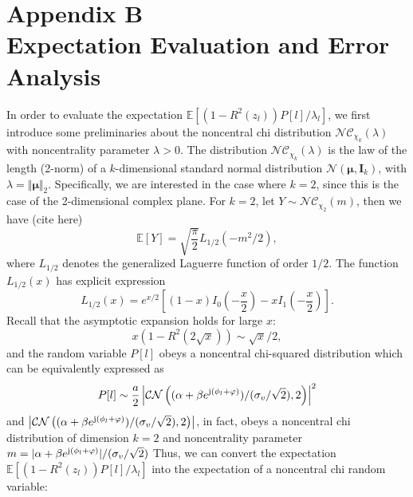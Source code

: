 \documentclass[12pt,draftclsnofoot,journal,onecolumn]{IEEEtran}
\theoremstyle{nonumberplain}
\def \CN {\mathcal{CN}}
\def \nc {\mathcal{NC}}
\begin{document}
\section*{Appendix B\\ Expectation Evaluation and Error Analysis}\label{appendix: expectation evaluation}
    In order to evaluate the expectation $\mathbb{E}[(1-R^2(z_l))P[l]/\lambda_l]$, we first introduce some preliminaries about the noncentral chi distribution $\nc_{\chi_k}(\lambda)$ with noncentrality parameter $\lambda>0$. The distribution $\nc_{\chi_k}(\lambda)$ is the law of the length (2-norm) of a $k$-dimensional standard normal distribution $\mathcal{N}({\bm \mu}, {\bm I}_k)$, with $\lambda = \Vert {\bm \mu} \Vert_2$. Specifically, we are interested in the case where $k=2$, since this is the case of the 2-dimensional complex plane. For  $k=2$, let $Y \sim \nc_{\chi_2}(m)$, then we have (cite here)
    \begin{equation}
        \mathbb{E}\left[Y\right] = \sqrt{\frac{\pi}{2}}L_{1/2}(-m^2/2),
        \label{eqn:noncentral chi mean}
    \end{equation}
    where $L_{1/2}$ denotes the generalized Laguerre function of order $1/2$. The function $L_{1/2}(x)$ has explicit expression 
    \begin{equation}
        L_{1/2}(x) = e^{x/2}\left[(1-x)I_0\left(-\frac{x}{2}\right)-xI_1\left(-\frac{x}{2}\right) \right].
        \label{eqn:Laguerre half order}
    \end{equation}
    Recall that the asymptotic expansion holds for large $x$:
    \begin{equation}
        x(1-R^2(2\sqrt{x})) \sim \sqrt{x}/2,
        \label{eqn:asym_expansion}
    \end{equation}
    and the random variable $P[l]$ obeys a noncentral chi-squared distribution which can be equivalently expressed as 
    \begin{equation}
        P[l] \sim \frac{a}{2} \left| \CN\left((\alpha + \beta e^{{\rm j} (\phi_l + \varphi)})/(\sigma_v / \sqrt{2}), 2\right)\right|^2
    \end{equation}
    and $\left| \CN\left((\alpha + \beta e^{{\rm j} (\phi_l + \varphi)})/(\sigma_v / \sqrt{2}), 2\right)\right|$, in fact, obeys a noncentral chi distribution of dimension $k=2$ and noncentrality parameter $m=\lvert\alpha + \beta e^{{\rm j} (\phi_l + \varphi)}\rvert/(\sigma_v / \sqrt{2})$ Thus, we can convert the expectation  $\mathbb{E}[(1-R^2(z_l))P[l]/\lambda_l]$ into the expectation of a noncentral chi random variable:
\end{document}
